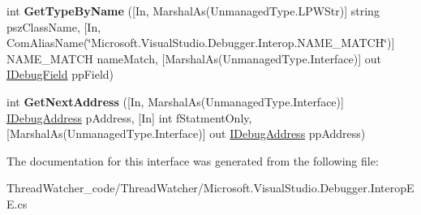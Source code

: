 \begin{DoxyCompactItemize}
\item 
\hypertarget{interface_microsoft_1_1_visual_studio_1_1_debugger_1_1_interop_e_e_1_1_i_debug_symbol_provider_ae873c4c85e8d302eaca466ba170928a8}{int {\bfseries Get\+Type\+By\+Name} (\mbox{[}In, Marshal\+As(Unmanaged\+Type.\+L\+P\+W\+Str)\mbox{]} string psz\+Class\+Name, \mbox{[}In, Com\+Alias\+Name(\char`\"{}Microsoft.\+Visual\+Studio.\+Debugger.\+Interop.\+N\+A\+M\+E\+\_\+\+M\+A\+T\+C\+H\char`\"{})\mbox{]} N\+A\+M\+E\+\_\+\+M\+A\+T\+C\+H name\+Match, \mbox{[}Marshal\+As(Unmanaged\+Type.\+Interface)\mbox{]} out \hyperlink{interface_microsoft_1_1_visual_studio_1_1_debugger_1_1_interop_e_e_1_1_i_debug_field}{I\+Debug\+Field} pp\+Field)}\label{interface_microsoft_1_1_visual_studio_1_1_debugger_1_1_interop_e_e_1_1_i_debug_symbol_provider_ae873c4c85e8d302eaca466ba170928a8}

\item 
\hypertarget{interface_microsoft_1_1_visual_studio_1_1_debugger_1_1_interop_e_e_1_1_i_debug_symbol_provider_ace68fa7135ead69e2b0799fc252664b8}{int {\bfseries Get\+Next\+Address} (\mbox{[}In, Marshal\+As(Unmanaged\+Type.\+Interface)\mbox{]} \hyperlink{interface_microsoft_1_1_visual_studio_1_1_debugger_1_1_interop_e_e_1_1_i_debug_address}{I\+Debug\+Address} p\+Address, \mbox{[}In\mbox{]} int f\+Statment\+Only, \mbox{[}Marshal\+As(Unmanaged\+Type.\+Interface)\mbox{]} out \hyperlink{interface_microsoft_1_1_visual_studio_1_1_debugger_1_1_interop_e_e_1_1_i_debug_address}{I\+Debug\+Address} pp\+Address)}\label{interface_microsoft_1_1_visual_studio_1_1_debugger_1_1_interop_e_e_1_1_i_debug_symbol_provider_ace68fa7135ead69e2b0799fc252664b8}

\end{DoxyCompactItemize}


The documentation for this interface was generated from the following file\+:\begin{DoxyCompactItemize}
\item 
Thread\+Watcher\+\_\+code/\+Thread\+Watcher/Microsoft.\+Visual\+Studio.\+Debugger.\+Interop\+E\+E.\+cs\end{DoxyCompactItemize}
